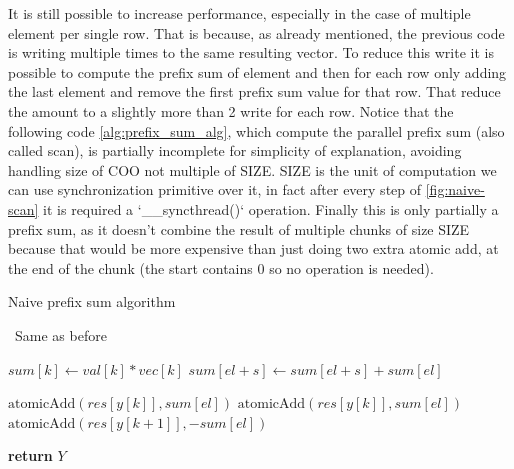 \documentclass[conference]{IEEEtran}
\begin{document}
It is still possible to increase performance, especially in the case of multiple element per single row. That is because, as already mentioned, the previous code is writing multiple times to the same resulting vector. To reduce this write it is possible to compute the prefix sum of element and then for each row only adding the last element and remove the first prefix sum value for that row. That reduce the amount to a slightly more than 2 write for each row. Notice that the following code \ref{alg:prefix_sum_alg}, which compute the parallel prefix sum (also called scan), is partially incomplete for simplicity of explanation, avoiding handling size of COO not multiple of SIZE. SIZE is the unit of computation we can use synchronization primitive over it, in fact after every step of \ref{fig:naive-scan} it is required a `\_\_syncthread()` operation. Finally this is only partially a prefix sum, as it doesn't combine the result of multiple chunks of size SIZE because that would be more expensive than just doing two extra atomic add, at the end of the chunk (the start contains 0 so no operation is needed).



\begin{algorithm}[h!]
	\caption{Naive prefix sum algorithm}
	\algorithmicrequire~Same as before
	\begin{algorithmic}[1]
			\State {}
			\State $sum[k] \leftarrow  val[k] * vec[k]$
			\State {}
					\State $sum[el + s]  \leftarrow sum[el + s] + sum[el]$
				\EndIf
			\EndFor
			\State {}

				\State $\text{atomicAdd}(res[y[k]], sum[el])$
			\Else
					\State $\text{atomicAdd}(res[y[k]], sum[el])$
					\State $\text{atomicAdd}(res[y[k + 1]], -sum[el])$
				\EndIf
			\EndIf

		\EndFor
		\State \textbf{return} $Y$
		\EndProcedure
	\end{algorithmic}
	\label{alg:prefix_sum_alg}
\end{algorithm}
\end{document}
